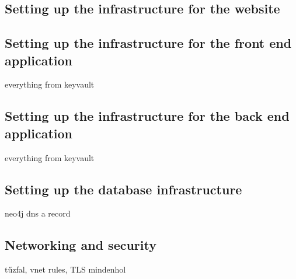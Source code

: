 \subsection{Setting up the infrastructure for the website}

\subsection{Setting up the infrastructure for the front end application}
everything from keyvault

\subsection{Setting up the infrastructure for the back end application}
everything from keyvault

\subsection{Setting up the database infrastructure}
\label{section:database}
neo4j dns a record

\subsection{Networking and security}
tűzfal, vnet rules, TLS mindenhol
